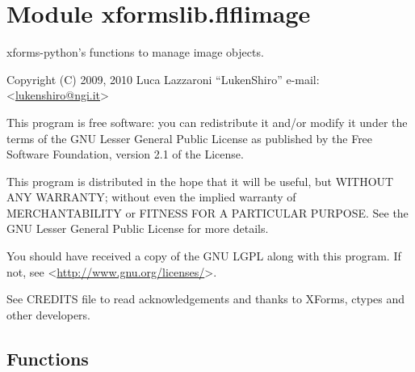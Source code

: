 %
%
%


\section{Module xformslib.flflimage}

    \label{xformslib:flflimage}

xforms-python's functions to manage image objects.

Copyright (C) 2009, 2010  Luca Lazzaroni ``LukenShiro''
e-mail: <\href{mailto:lukenshiro@ngi.it}{lukenshiro@ngi.it}>

This program is free software: you can redistribute it and/or modify
it under the terms of the GNU Lesser General Public License as
published by the Free Software Foundation, version 2.1 of the License.

This program is distributed in the hope that it will be useful,
but WITHOUT ANY WARRANTY; without even the implied warranty of
MERCHANTABILITY or FITNESS FOR A PARTICULAR PURPOSE. See the
GNU Lesser General Public License for more details.

You should have received a copy of the GNU LGPL along with this
program. If not, see <\href{http://www.gnu.org/licenses/}{http://www.gnu.org/licenses/}>.

See CREDITS file to read acknowledgements and thanks to XForms,
ctypes and other developers.


  \subsection{Functions}

    \label{xformslib:flflimage:FL_RGB2GRAY}

